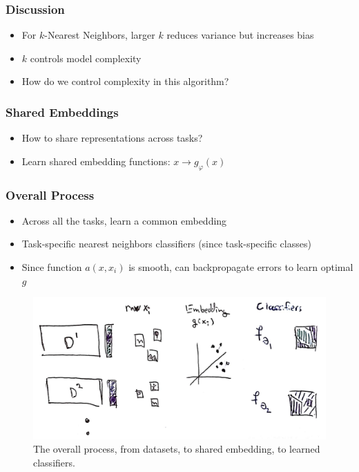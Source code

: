 \documentclass[10pt,mathserif]{beamer}
\begin{document}
\begin{frame}
  \frametitle{Discussion}
  \begin{itemize}
  \item For $k$-Nearest Neighbors, larger $k$ reduces variance but increases bias
  \item $k$ controls model complexity
  \item How do we control complexity in this algorithm?
  \end{itemize} 
\end{frame}

\begin{frame}
  \frametitle{Shared Embeddings}
 \begin{itemize}
 \item How to share representations across tasks? 
 \item Learn shared embedding functions: $x \rightarrow g_\varphi\left(x\right)$
 \end{itemize} 
\end{frame}

\begin{frame}
  \frametitle{Overall Process \citep{vinyals2016matching}}
 \begin{itemize}
 \item  Across all the tasks, learn a common embedding
 \item Task-specific nearest neighbors classifiers (since task-specific classes)
 \item Since function $a\left(x, x_i\right)$ is smooth, can backpropagate errors
   to learn optimal $g$
 \end{itemize} 
\begin{figure}[ht]
  \centering
  \includegraphics[width=0.7\paperwidth]{figure/nn_full_process}
  \caption{The overall process, from datasets, to shared embedding, to learned
    classifiers. \label{fig:nn_full_process} }
\end{figure}
\end{frame}
\end{document}
